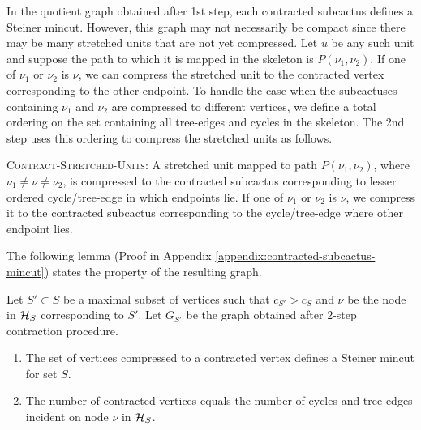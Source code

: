 In the quotient graph obtained after 1st step, each contracted subcactus defines a Steiner mincut. 
However, this graph may not necessarily be compact since there may be many stretched units that are not yet compressed. 
Let $u$ be any such unit and suppose
the path to which it is mapped in the skeleton is $P(\nu_1,\nu_2)$. If one of $\nu_1$ or $\nu_2$ is $\nu$, we can compress the stretched unit to the contracted vertex corresponding to the other endpoint. To handle the case when the subcactuses containing $\nu_1$ and $\nu_2$ are compressed to different vertices,
we define a total ordering on the set containing all tree-edges and cycles in the skeleton. The 2nd step uses this ordering to compress the stretched units as follows.


{\textsc{Contract-Stretched-Units}}: A stretched unit mapped to path $P(\nu_1,\nu_2)$, where $\nu_1\neq \nu \neq \nu_2$, is compressed to the contracted subcactus corresponding to lesser ordered cycle/tree-edge in which endpoints lie. If one of $\nu_1$ or $\nu_2$ is $\nu$, we compress it to the contracted subcactus corresponding to the cycle/tree-edge where other endpoint lies.

The following lemma (Proof in Appendix \ref{appendix:contracted-subcactus-mincut}) states the property of the resulting graph.

\begin{lemma}
Let $S'\subset S$ be a maximal subset of vertices such that $c_{S'}>c_S$ and $\nu$ be the node in ${\cal H}_S$ corresponding to $S'$. Let $G_{S'}$ be the graph obtained after %
$2$-step contraction procedure. 
\begin{enumerate}
    \item The set of vertices compressed to a contracted vertex defines a Steiner mincut for set $S$.
    \item The number of contracted vertices equals the number of cycles and tree edges incident on node $\nu$ in ${\cal H}_S$.
\end{enumerate}
\label{lem:contracted-subcactus-mincut}
\end{lemma}

